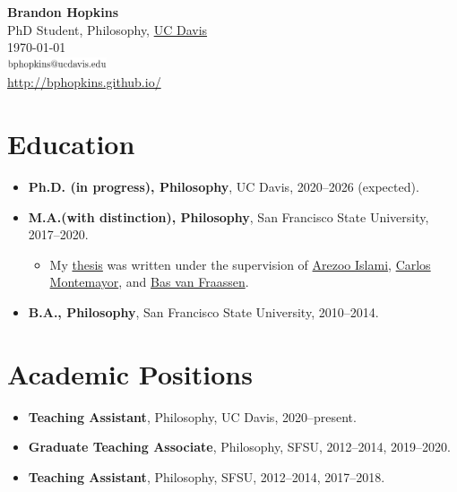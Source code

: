 \documentclass{article}
\begin{document}
\begin{center}
    {\LARGE\textbf{Brandon Hopkins}}\\
    \vspace{3mm}
    PhD Student, Philosophy, \href{https://philosophy.ucdavis.edu/}{UC Davis}\\
    \vspace{2mm}
    \today\\
    \vspace{2mm}
    \includegraphics[width=0.22\textwidth]{../../images/email.png}\\
    \vspace{1mm}
    \url{http://bphopkins.github.io/}
\end{center}


\section*{Education}
\begin{itemize}
    \item \textbf{Ph.D. (in progress), Philosophy}, UC Davis, 2020--2026 (expected).
    \item \textbf{M.A.(with distinction), Philosophy}, San Francisco State University, 2017--2020.
    \begin{itemize}
        \item My \href{http://hdl.handle.net/20.500.12680/n870zx00b}{thesis} was written under the supervision of \href{https://www.arezooislami.com/}{Arezoo Islami}, \href{https://sites.google.com/site/carlosmontemayorphilosophysfsu/}{Carlos Montemayor}, and \href{https://www.princeton.edu/~fraassen/}{Bas van Fraassen}.
    \end{itemize}
    \item \textbf{B.A., Philosophy}, San Francisco State University, 2010--2014.
\end{itemize}


\section*{Academic Positions}
\begin{itemize}
    \item \textbf{Teaching Assistant}, Philosophy, UC Davis, 2020--present.
    \item \textbf{Graduate Teaching Associate}, Philosophy, SFSU, 2012--2014, 2019--2020.
    \item \textbf{Teaching Assistant}, Philosophy, SFSU, 2012--2014, 2017--2018.
\end{itemize}
\end{document}
